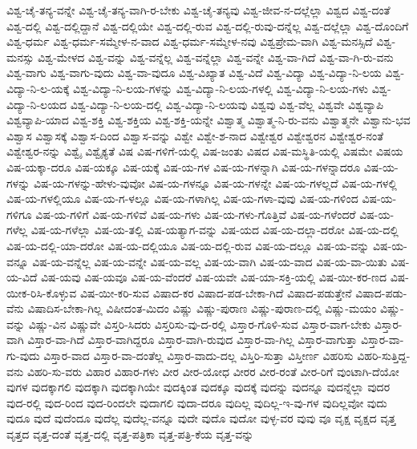 {ವಿಶ್ವ-ಚೈ-ತನ್ಯ-ವನ್ನೇ
ವಿಶ್ವ-ಚೈ-ತನ್ಯ-ವಾಗಿ-ರ-ಬೇಕು
ವಿಶ್ವ-ಚೈ-ತನ್ಯವು
ವಿಶ್ವ-ಜೀವ-ನ-ದಲ್ಲೆಲ್ಲಾ
ವಿಶ್ವದ
ವಿಶ್ವ-ದಂತೆ
ವಿಶ್ವ-ದಲ್ಲಿ
ವಿಶ್ವ-ದಲ್ಲಿದ್ದಾನೆ
ವಿಶ್ವ-ದಲ್ಲಿಯೇ
ವಿಶ್ವ-ದಲ್ಲಿ-ರುವ
ವಿಶ್ವ-ದಲ್ಲಿ-ರುವು-ದನ್ನೆಲ್ಲ
ವಿಶ್ವ-ದಲ್ಲೆಲ್ಲಾ
ವಿಶ್ವ-ದೊಂದಿಗೆ
ವಿಶ್ವ-ಧರ್ಮ
ವಿಶ್ವ-ಧರ್ಮ-ಸಮ್ಮೇಳ-ನ-ವಾದ
ವಿಶ್ವ-ಧರ್ಮ-ಸಮ್ಮೇಳ-ನವು
ವಿಶ್ವಪ್ರೇಮ-ವಾಗಿ
ವಿಶ್ವ-ಮನಸ್ಸಿದೆ
ವಿಶ್ವ-ಮನಸ್ಸು
ವಿಶ್ವ-ಮೇಳದ
ವಿಶ್ವ-ವನ್ನು
ವಿಶ್ವ-ವನ್ನೆಲ್ಲ
ವಿಶ್ವ-ವನ್ನೆಲ್ಲಾ
ವಿಶ್ವ-ವನ್ನೇ
ವಿಶ್ವ-ವಾ-ಗಿದೆ
ವಿಶ್ವ-ವಾ-ಗಿ-ರು-ವನು
ವಿಶ್ವ-ವಾಗು
ವಿಶ್ವ-ವಾಗು-ವುದು
ವಿಶ್ವ-ವಾ-ವುದೂ
ವಿಶ್ವ-ವಿಖ್ಯಾತ
ವಿಶ್ವ-ವಿದೆ
ವಿಶ್ವ-ವಿದ್ಯಾ
ವಿಶ್ವ-ವಿದ್ಯಾ-ನಿ-ಲಯ
ವಿಶ್ವ-ವಿದ್ಯಾ-ನಿ-ಲ-ಯಕ್ಕೆ
ವಿಶ್ವ-ವಿದ್ಯಾ-ನಿ-ಲಯ-ಗಳನ್ನು
ವಿಶ್ವ-ವಿದ್ಯಾ-ನಿ-ಲಯ-ಗಳಲ್ಲಿ
ವಿಶ್ವ-ವಿದ್ಯಾ-ನಿ-ಲಯ-ಗಳು
ವಿಶ್ವ-ವಿದ್ಯಾ-ನಿ-ಲಯದ
ವಿಶ್ವ-ವಿದ್ಯಾ-ನಿ-ಲಯ-ದಲ್ಲಿ
ವಿಶ್ವ-ವಿದ್ಯಾ-ನಿ-ಲಯವು
ವಿಶ್ವವು
ವಿಶ್ವ-ವೆಲ್ಲ
ವಿಶ್ವವೇ
ವಿಶ್ವವ್ಯಾಪಿ
ವಿಶ್ವವ್ಯಾಪಿ-ಯಾದ
ವಿಶ್ವ-ಶಕ್ತಿ
ವಿಶ್ವ-ಶಕ್ತಿಯ
ವಿಶ್ವ-ಶಕ್ತಿ-ಯನ್ನೇ
ವಿಶ್ವಾತ್ಮ
ವಿಶ್ವಾತ್ಮ-ನಿ-ರು-ವನು
ವಿಶ್ವಾತ್ಮನೇ
ವಿಶ್ವಾನು-ಭವ
ವಿಶ್ವಾಸ
ವಿಶ್ವಾಸಕ್ಕೆ
ವಿಶ್ವಾಸ-ದಿಂದ
ವಿಶ್ವಾಸ-ವನ್ನು
ವಿಶ್ವೇ
ವಿಶ್ವೇ-ಶ-ನಾದ
ವಿಶ್ವೇಶ್ವರ
ವಿಶ್ವೇಶ್ವರನ
ವಿಶ್ವೇಶ್ವರ-ನಂತೆ
ವಿಶ್ವೇಶ್ವರ-ನನ್ನು
ವಿಶ್ವೈ
ವಿಶ್ವೈಕ್ಯತೆ
ವಿಷ
ವಿಷ-ಗಳಿಗೆ-ಯಲ್ಲಿ
ವಿಷ-ಜಂತು
ವಿಷದ
ವಿಷ-ಮಸ್ಥಿತಿ-ಯಲ್ಲಿ
ವಿಷಮೇ
ವಿಷಯ
ವಿಷ-ಯಕ್ಕಾ-ದರೂ
ವಿಷ-ಯಕ್ಕೂ
ವಿಷ-ಯಕ್ಕೆ
ವಿಷ-ಯ-ಗಳ
ವಿಷ-ಯ-ಗಳನ್ನಾಗಿ
ವಿಷ-ಯ-ಗಳನ್ನಾದರೂ
ವಿಷ-ಯ-ಗಳನ್ನು
ವಿಷ-ಯ-ಗಳನ್ನು-ಹೇಳು-ವುವೋ
ವಿಷ-ಯ-ಗಳನ್ನೂ
ವಿಷ-ಯ-ಗಳನ್ನೇ
ವಿಷ-ಯ-ಗಳಲ್ಲದೆ
ವಿಷ-ಯ-ಗಳಲ್ಲಿ
ವಿಷ-ಯ-ಗಳಲ್ಲಿಯೂ
ವಿಷ-ಯ-ಗ-ಳಲ್ಲೂ
ವಿಷ-ಯ-ಗಳಾಗಿಲ್ಲ
ವಿಷ-ಯ-ಗಳಾ-ವುವು
ವಿಷ-ಯ-ಗಳಿಂದ
ವಿಷ-ಯ-ಗಳಿಗೂ
ವಿಷ-ಯ-ಗಳಿಗೆ
ವಿಷ-ಯ-ಗಳಿವೆ
ವಿಷ-ಯ-ಗಳು
ವಿಷ-ಯ-ಗಳು-ಗೊತ್ತಿವೆ
ವಿಷ-ಯ-ಗಳೆಂದರೆ
ವಿಷ-ಯ-ಗಳೆಲ್ಲ
ವಿಷ-ಯ-ಗಳೆಲ್ಲಾ
ವಿಷ-ಯ-ತಲ್ಲಿ
ವಿಷ-ಯತ್ಯಾಗ-ವನ್ನು
ವಿಷ-ಯದ
ವಿಷ-ಯ-ದಲ್ಲಾ-ದರೋ
ವಿಷ-ಯ-ದಲ್ಲಿ
ವಿಷ-ಯ-ದಲ್ಲಿ-ಯಾ-ದರೋ
ವಿಷ-ಯ-ದಲ್ಲಿಯೂ
ವಿಷ-ಯ-ದಲ್ಲಿ-ರುವ
ವಿಷ-ಯ-ದಲ್ಲೂ
ವಿಷ-ಯ-ವನ್ನು
ವಿಷ-ಯ-ವನ್ನೂ
ವಿಷ-ಯ-ವನ್ನೆಲ್ಲ
ವಿಷ-ಯ-ವನ್ನೇ
ವಿಷ-ಯ-ವಲ್ಲ
ವಿಷ-ಯ-ವಾಗಿ
ವಿಷ-ಯ-ವಾದ
ವಿಷ-ಯ-ವಾ-ಯಿತು
ವಿಷ-ಯ-ವಿದೆ
ವಿಷ-ಯವು
ವಿಷ-ಯವೂ
ವಿಷ-ಯ-ವೆಂದರೆ
ವಿಷ-ಯವೇ
ವಿಷ-ಯಾ-ಸಕ್ತಿ-ಯಲ್ಲಿ
ವಿಷ-ಯೀ-ಕರ-ಣದ
ವಿಷ-ಯೀಕ-ರಿಸಿ-ಕೊಳ್ಳುವ
ವಿಷ-ಯೀ-ಕರಿ-ಸುವ
ವಿಷಾದ-ಕರ
ವಿಷಾದ-ಪಡ-ಬೇಕಾ-ಗಿದೆ
ವಿಷಾದ-ಪಡುತ್ತೇನೆ
ವಿಷಾದ-ಪಡು-ವೆನು
ವಿಷಾದಿಸ-ಬೇಕಾ-ಗಿಲ್ಲ
ವಿಷೀದಂತ-ಮಿದಂ
ವಿಷ್ಣು
ವಿಷ್ಣು-ಪುರಾಣ
ವಿಷ್ಣು-ಪುರಾಣ-ದಲ್ಲಿ
ವಿಷ್ಣು-ಮಯಂ
ವಿಷ್ಣು-ವನ್ನು
ವಿಷ್ಣು-ವಿನ
ವಿಷ್ಣುವೇ
ವಿಸ್ತರಿ-ಸಿದರು
ವಿಸ್ತರಿಸು-ವು-ದ-ರಲ್ಲಿ
ವಿಸ್ತಾರ-ಗೊಳಿ-ಸುವ
ವಿಸ್ತಾರ-ವಾಗ-ಬೇಕು
ವಿಸ್ತಾರ-ವಾಗಿ
ವಿಸ್ತಾರ-ವಾ-ಗಿದೆ
ವಿಸ್ತಾರ-ವಾಗಿದ್ದರೂ
ವಿಸ್ತಾರ-ವಾಗಿ-ರುವುದ
ವಿಸ್ತಾರ-ವಾ-ಗಿಲ್ಲ
ವಿಸ್ತಾರ-ವಾಗುತ್ತಾ
ವಿಸ್ತಾರ-ವಾ-ಗು-ವುದು
ವಿಸ್ತಾರ-ವಾದ
ವಿಸ್ತಾರ-ವಾ-ದಂತೆಲ್ಲ
ವಿಸ್ತಾರ-ವಾದು-ದಲ್ಲ
ವಿಸ್ತಿರಿ-ಸುತ್ತಾ
ವಿಸ್ತೀರ್ಣ
ವಿಹರಿಸು
ವಿಹರಿ-ಸುತ್ತಿದ್ದ-ವನು
ವಿಹರಿ-ಸು-ವರು
ವಿಹಾರ
ವಿಹಾರ-ಗಳು
ವೀರ
ವೀರ-ಯೋಧ
ವೀರರ
ವೀರ-ರಂತೆ
ವೀರ-ರಿಗೆ
ವುಂಟಾಗಿ-ದೆಯೋ
ವುಗಳ
ವುದಕ್ಕಾಗಲಿ
ವುದಕ್ಕಾಗಿ
ವುದಕ್ಕಾಗಿಯೇ
ವುದಕ್ಕಿಂತ
ವುದಕ್ಕೂ
ವುದಕ್ಕೆ
ವುದನ್ನು
ವುದನ್ನೂ
ವುದನ್ನೆಲ್ಲಾ
ವುದರ
ವುದ-ರಲ್ಲಿ
ವುದ-ರಿಂದ
ವುದ-ರಿಂದಲೇ
ವುದಾಗಲಿ
ವುದಾ-ದರೂ
ವುದಿಲ್ಲ
ವುದಿಲ್ಲ-ಇ-ವು-ಗಳ
ವುದಿಲ್ಲವೋ
ವುದು
ವುದೂ
ವುದೆ
ವುದೆಂದೂ
ವುದೆಲ್ಲ
ವುದೆಲ್ಲ-ವನ್ನೂ
ವುದೇ
ವುದೊ
ವುದೋ
ವುಳ್ಳ-ವರ
ವುವು
ವೂ
ವೃಕ್ಷ
ವೃಕ್ಷದ
ವೃತ್ತ
ವೃತ್ತದ
ವೃತ್ತ-ದಂತೆ
ವೃತ್ತ-ದಲ್ಲಿ
ವೃತ್ತ-ಪತ್ರಿಕಾ
ವೃತ್ತ-ಪತ್ರಿ-ಕೆಯ
ವೃತ್ತ-ವನ್ನು
}
